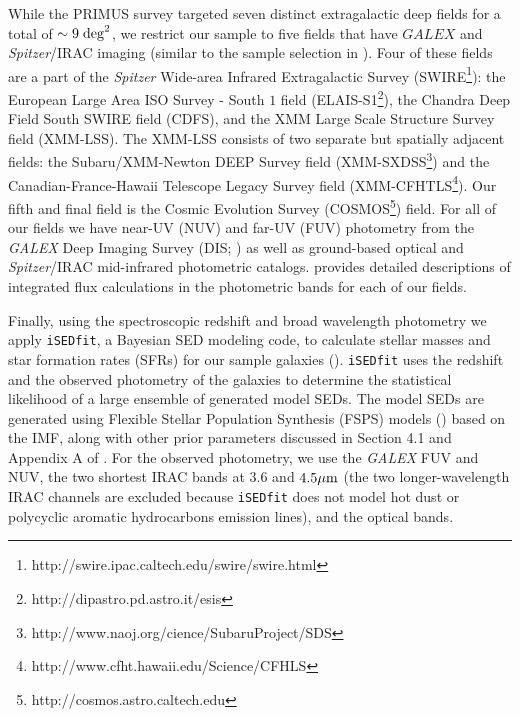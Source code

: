 \documentclass{emulateapj}
\begin{document}
While the PRIMUS survey targeted seven distinct extragalactic deep fields for a total of $\sim 9 \; \rm{deg}^2$, we restrict our sample to five fields that have $GALEX$ and {\em Spitzer}/IRAC imaging (similar to the sample selection in \citealt{Moustakas:2013aa}). Four of these fields are a part of the {\em Spitzer} Wide-area Infrared Extragalactic Survey (SWIRE\footnote{http://swire.ipac.caltech.edu/swire/swire.html}): the European Large Area ISO Survey - South $1$ field (ELAIS-S1\footnote{http://dipastro.pd.astro.it/esis}), the Chandra Deep Field South SWIRE field (CDFS), and the XMM Large Scale Structure Survey field (XMM-LSS). The XMM-LSS consists of two separate but spatially adjacent fields: the Subaru/XMM-Newton DEEP Survey field (XMM-SXDSS\footnote{http://www.naoj.org/cience/SubaruProject/SDS}) and the Canadian-France-Hawaii Telescope Legacy Survey field (XMM-CFHTLS\footnote{http://www.cfht.hawaii.edu/Science/CFHLS}). Our fifth and final field is the Cosmic Evolution Survey (COSMOS\footnote{http://cosmos.astro.caltech.edu}) field. For all of our fields we have near-UV (NUV) and far-UV (FUV) photometry from the {\em GALEX} Deep Imaging Survey (DIS; \citealt{Martin:2005aa, Morrissey:2005aa}) as well as ground-based optical and {\em Spitzer}/IRAC mid-infrared photometric catalogs. \cite{Moustakas:2013aa} provides detailed descriptions of integrated flux calculations in the photometric bands for each of our fields. 

Finally, using the spectroscopic redshift and broad wavelength photometry we apply \texttt{iSEDfit}, a Bayesian SED modeling code, to calculate stellar masses and star formation rates (SFRs) for our sample galaxies (\citealt{Moustakas:2013aa}). \texttt{iSEDfit} uses the redshift and the observed photometry of the galaxies to determine the statistical likelihood of a large ensemble of generated model SEDs. The model SEDs are generated using Flexible Stellar Population Synthesis (FSPS) models (\citealt{Conroy:2010aa}) based on the \cite{Chabrier:2003aa} IMF, along with other prior parameters discussed in Section 4.1 and Appendix A of \cite{Moustakas:2013aa}. For the observed photometry, we use the {\em GALEX} FUV and NUV, the two shortest IRAC bands at $3.6$ and $4.5 \mu \rm{m}$ (the two longer-wavelength IRAC channels are excluded because \texttt{iSEDfit} does not model hot dust or polycyclic aromatic hydrocarbons emission lines), and the optical bands. 
\end{document}
